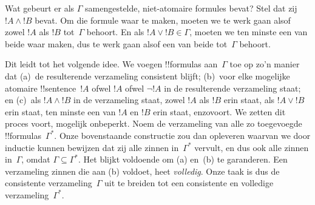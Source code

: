 \documentclass[openany]{memoir}
\begin{document}
Wat gebeurt er als $\Gamma$ samengestelde, niet-atomaire formules
bevat? Stel dat zij $!A \land !B$ bevat. Om die formule waar te maken,
moeten we te werk gaan alsof zowel $!A$ als $!B$ tot~$\Gamma$ behoort.
En als $!A \lor !B \in \Gamma$, moeten we ten minste een van beide
waar maken, dus te werk gaan alsof een van beide tot~$\Gamma$ behoort.

Dit leidt tot het volgende idee. We voegen !!{formula}s aan~$\Gamma$
toe op zo'n manier dat (a)~de resulterende verzameling consistent
blijft; (b)~voor elke mogelijke atomaire !!{sentence}~$!A$ ofwel $!A$
ofwel $\lnot !A$ in de resulterende verzameling staat; en (c)~als
$!A \land !B$ in de verzameling staat, zowel $!A$ als $!B$ erin staat,
als $!A \lor !B$ erin staat, ten minste een van $!A$ en $!B$ erin staat,
enzovoort. We zetten dit proces voort, mogelijk onbeperkt. Noem de
verzameling van alle zo toegevoegde !!{formula}s~$\Gamma^*$. Onze
bovenstaande constructie zou dan
opleveren waarvan we door inductie kunnen bewijzen dat zij alle zinnen
in~$\Gamma^*$ vervult, en dus ook alle zinnen in~$\Gamma$, omdat
$\Gamma \subseteq \Gamma^*$. Het blijkt voldoende om (a) en~(b) te
garanderen. Een verzameling zinnen die aan (b) voldoet, heet
\emph{volledig}. Onze taak is dus de consistente verzameling~$\Gamma$
uit te breiden tot een consistente en volledige verzameling~$\Gamma^*$.
\end{document}
